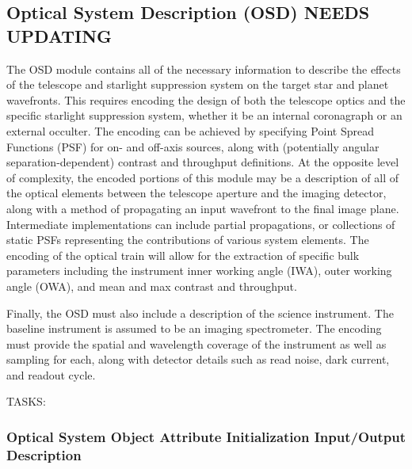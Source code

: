 \documentclass[cleanfoot]{asme2ej}
\begin{document}
\subsection{Optical System Description (OSD) NEEDS UPDATING}
The OSD module contains all of the necessary information to describe the effects of the telescope and starlight suppression system on the target star and planet wavefronts.  This requires encoding the design of both the telescope optics and the specific starlight suppression system, whether it be an internal coronagraph or an external occulter.  The encoding can be achieved by specifying Point Spread Functions (PSF) for on- and off-axis sources, along with (potentially angular separation-dependent) contrast and throughput definitions.  At the opposite level of complexity, the encoded portions of this module may be a description of all of the optical elements between the telescope aperture and the imaging detector, along with a method of propagating an input wavefront to the final image plane.  Intermediate implementations can include partial propagations, or collections of static PSFs representing the contributions of various system elements.  The encoding of the optical train will allow for the extraction of specific bulk parameters including the instrument inner working angle (IWA), outer working angle (OWA), and mean and max contrast and throughput.

Finally, the OSD must also include a description of the science instrument.  The baseline instrument is assumed to be an imaging spectrometer.  The encoding must provide the spatial and wavelength coverage of the instrument as well as sampling for each, along with detector details such as read noise, dark current, and readout cycle.

TASKS:


\label{sec:opticalsystem}
\subsubsection{Optical System Object Attribute Initialization Input/Output Description} 
\end{document}
